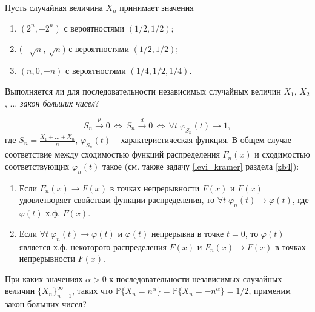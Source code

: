 
\begin{problem}
Пусть случайная величина $X_n$ принимает значения 
\begin{enumerate}
\item $(2^n, -2^n)$ с вероятностями $(1/2, 1/2)$;
\item $(-\sqrt{n}$, $\sqrt{n})$ с вероятностями $(1/2, 1/2)$;
\item $(n, 0, -n)$ с вероятностями $(1/4, 1/2, 1/4)$.
\end{enumerate}
Выполняется ли для последовательности независимых случайных величин 
$X_1$, $X_2$, $\ldots$ \textit{закон больших чисел}? 
\end{problem}

\begin{ordre}
 
\[
S_n\xrightarrow{p}0 \,\Leftrightarrow\, S_n\xrightarrow{d}0 \,\Leftrightarrow\, \forall t \; \varphi_{S_n}(t) \to 1,   
\]
\noindent где $S_n=\frac{X_1+\ldots +X_n}{n}$, $\varphi_{S_n}(t)$ -- характеристическая функция. В общем случае соответствие между сходимостью функций распределения $F_n(x)$ и сходимостью соответствующих $\varphi_n(t)$ такое (см. также задачу \ref{levi_kramer} раздела \ref{zb4}):
\begin{enumerate}
\item Если $F_n(x) \to F(x)$ в точках непрерывности $F(x)$ и $F(x)$ удовлетворяет свойствам функции распределения, то $\forall t \; \varphi_n(t) \to \varphi(t)$, где $\varphi(t)$ х.ф. $F(x)$.
\item Если $\forall t \; \varphi_n(t) \to \varphi(t)$ и $\varphi(t)$ непрерывна в точке $t = 0$, то $\varphi(t)$ является х.ф. некоторого распределения $F(x)$  и $F_n(x) \to F(x)$ в точках непрерывности $F(x)$.

\end{enumerate}

\end{ordre}


\begin{problem}
При каких значениях $\alpha > 0$ к последовательности независимых случайных величин $\{ X_n\}_{n=1}^{\infty}$, 
таких что ${\mathbb P}\{ X_n=n^{\alpha}\}={\mathbb P}\{ X_n=-n^{\alpha}\}=1/2$, применим закон больших чисел? 
\end{problem}

